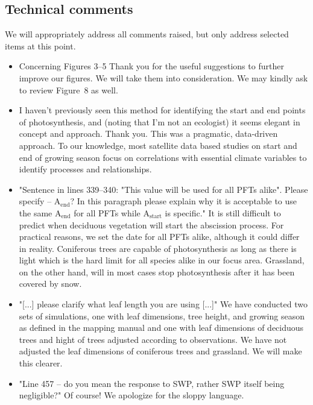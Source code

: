 \documentclass{scrartcl}
\begin{document}
\subsection*{Technical comments}
We will appropriately address all comments raised, but only address selected items at this point.
\begin{itemize}
    \item {\color{blue} Concerning Figures 3--5} Thank you for the useful suggestions to further improve our figures. We will take them into consideration. We may kindly ask to review Figure~8 as well.
    \item {\color{blue} I haven't previously seen this method for identifying the start and end points of photosynthesis, and (noting that I'm not an ecologist) it seems elegant in concept and approach.} Thank you. This was a pragmatic, data-driven approach. To our knowledge, most satellite data based studies on start and end of growing season focus on correlations with essential climate variables to identify processes and relationships.
    \item {\color{blue}"Sentence in lines 339--340: "This value will be used for all PFTs alike". Please specify -- $\mathrm{A_{end}}$? In this paragraph please explain why it is acceptable to use the same $\mathrm{A_{end}}$ for all PFTs while $\mathrm{A_{start}}$ is specific."} It is still difficult to predict when deciduous vegetation will start the abscission process. For practical reasons, we set the date for all PFTs alike, although it could differ in reality. Coniferous trees are capable of photosynthesis as long as there is light which is the hard limit for all species alike in our focus area. Grassland, on the other hand, will in most cases stop photosynthesis after it has been covered by snow.
    \item {\color{blue} "[...] please clarify what leaf length you are using [...]"} We have conducted two sets of simulations, one with leaf dimensions, tree height, and growing season as defined in the mapping manual and one with leaf dimensions of deciduous trees and hight of trees adjusted according to observations. We have not adjusted the leaf dimensions of coniferous trees and grassland. We will make this clearer.
    \item {\color{blue} "Line 457 -- do you mean the response to SWP, rather SWP itself being negligible?"} Of course! We apologize for the sloppy language.

\end{itemize}
\end{document}
